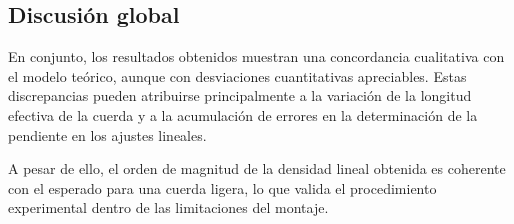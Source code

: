 \documentclass{article}
\begin{document}
\subsection{Discusión global}

En conjunto, los resultados obtenidos muestran una concordancia cualitativa con el modelo teórico, aunque con desviaciones cuantitativas apreciables. Estas discrepancias pueden atribuirse principalmente a la variación de la longitud efectiva de la cuerda y a la acumulación de errores en la determinación de la pendiente en los ajustes lineales.

A pesar de ello, el orden de magnitud de la densidad lineal obtenida es coherente con el esperado para una cuerda ligera, lo que valida el procedimiento experimental dentro de las limitaciones del montaje.
\end{document}

